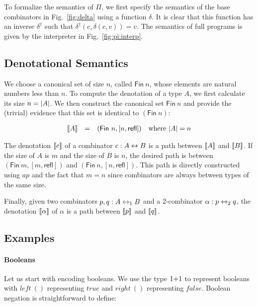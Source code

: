 \noindent To formalize the semantics of $\Pi$, we first specify the
semantics of the base combinators in Fig.~\ref{fig:delta} using a
function $\delta$. It is clear that this function has an inverse
$\delta^\dagger$ such that $\delta^\dagger(c,\delta(c,v))=v$. The semantics of full programs is given by the interpreter
in Fig.~\ref{fig:pi:interp}.

\subsection{Denotational Semantics}

We choose a canonical set of size $n$, called $\mathsf{Fin}~n$, whose elements are natural numbers less than $n$. To
compute the denotation of a type $A$, we first calculate its size $n = | A |$. We then construct the canonical set
$\mathsf{Fin}~n$ and provide the (trivial) evidence that this set is identical to $(\mathsf{Fin}~n)$:

\[\begin{array}{rcll}
\llbracket A \rrbracket &=& (\mathsf{Fin}~n, [ n , \mathsf{refl} ]) & \mbox{where}~| A | = n
\end{array}\]

\noindent The denotation $\llbracket c \rrbracket$ of a combinator $c : A \leftrightarrow B$ is a path between $\llbracket A \rrbracket$ and $\llbracket B \rrbracket$. If the
size of $A$ is $m$ and the size of $B$ is $n$, the desired path is between $(\mathsf{Fin}~m, [ m , \mathsf{refl} ])$ and
$(\mathsf{Fin}~n, [ n , \mathsf{refl} ])$. This path is directly constructed using $\mathit{ap}$ and the fact that $m=n$
since combinators are always between types of the same size.

\noindent Finally, given two combinators $p , q : A \leftrightarrow_1 B$ and a 2-combinator $\alpha : p \mathrel{\leftrightarrow}_2 q$, the denotation
$\llbracket \alpha \rrbracket$ of $\alpha$ is a path between $\llbracket p \rrbracket$ and $\llbracket q \rrbracket$.





\subsection{Examples}
\label{sec:langRev-examples}
\label{examples}


\paragraph*{Booleans}
Let us start with encoding booleans. We use the type \ensuremath{1{\sumtype}1} to
represent booleans with \ensuremath{\mathit{left} ~()} representing \ensuremath{\mathit{true}} and
\ensuremath{\mathit{right}~()} representing \ensuremath{\mathit{false}}.
Boolean negation is straightforward to define:


